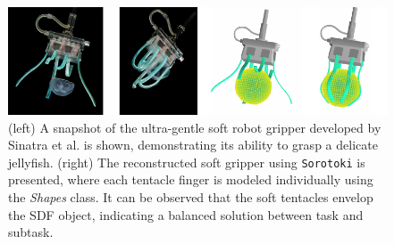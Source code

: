 \begin{figure}[!t]
\centering
\includegraphics*[width=.99\textwidth]{./pdf/thesis-figure-6-13.pdf}
%
\caption{(left) A snapshot of the ultra-gentle soft robot gripper developed by Sinatra et al. \cite{Sinatra2019Aug} is shown, demonstrating its ability to grasp a delicate jellyfish. (right) The reconstructed soft gripper using \texttt{Sorotoki} is presented, where each tentacle finger is modeled individually using the \textit{Shapes} class. It can be observed that the soft tentacles envelop the SDF object, indicating a balanced solution between task and subtask.}
\label{fig:C5:shapesexample}
\vspace{-5mm}
\end{figure}


